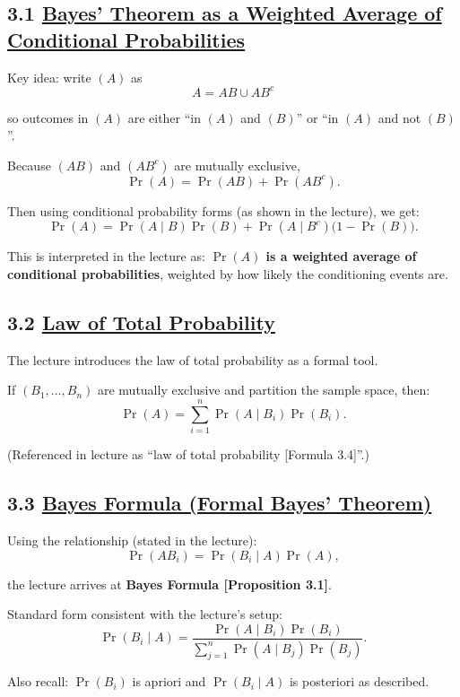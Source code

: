 \documentclass[11pt]{article}
\begin{document}
\vspace{0.5cm}
\subsection*{3.1 \underline{ Bayes’ Theorem as a Weighted Average of Conditional Probabilities}}

Key idea: write $(A)$ as
\[
A = AB \cup AB^c
\]

so outcomes in $(A)$ are either “in $(A)$ and $(B)$” or “in $(A)$ and not $(B)$”.

Because $(AB)$ and $(AB^c)$ are mutually exclusive,
\[
\Pr(A)=\Pr(AB)+\Pr(AB^c).
\]

Then using conditional probability forms (as shown in the lecture), we get:
\[
\Pr(A)=\Pr(A\mid B)\Pr(B)+\Pr(A\mid B^c)\bigl(1-\Pr(B)\bigr).
\]

This is interpreted in the lecture as: \textbf{$\Pr(A)$ is a weighted average of conditional probabilities}, weighted by how likely the conditioning events are.

\vspace{0.5cm}
\subsection*{3.2 \underline{Law of Total Probability}}

The lecture introduces the law of total probability as a formal tool.

If $(B_1,\dots,B_n)$ are mutually exclusive and partition the sample space, then:
\[
\Pr(A)=\sum_{i=1}^{n}\Pr(A\mid B_i)\Pr(B_i).
\]

(Referenced in lecture as “law of total probability [Formula 3.4]”.)

\vspace{0.5cm}
\subsection*{3.3 \underline{Bayes Formula (Formal Bayes’ Theorem)}}

Using the relationship (stated in the lecture):
\[
\Pr(AB_i)=\Pr(B_i\mid A)\Pr(A),
\]

the lecture arrives at \textbf{Bayes Formula [Proposition 3.1]}.

Standard form consistent with the lecture’s setup:
\[
\Pr(B_i\mid A)=\frac{\Pr(A\mid B_i)\Pr(B_i)}{\sum_{j=1}^{n}\Pr(A\mid B_j)\Pr(B_j)}.
\]

Also recall: $\Pr(B_i)$ is apriori and $\Pr(B_i\mid A)$ is posteriori as described.
\end{document}
